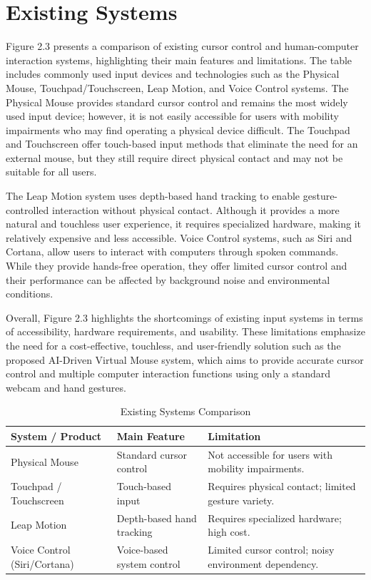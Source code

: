\documentclass[12pt,a4paper]{report}
\begin{document}
\newpage
\section{Existing Systems}
Figure 2.3 presents a comparison of existing cursor control and human-computer interaction systems, highlighting their main features and limitations. The table includes commonly used input devices and technologies such as the Physical Mouse, Touchpad/Touchscreen, Leap Motion, and Voice Control systems. The Physical Mouse provides standard cursor control and remains the most widely used input device; however, it is not easily accessible for users with mobility impairments who may find operating a physical device difficult. The Touchpad and Touchscreen offer touch-based input methods that eliminate the need for an external mouse, but they still require direct physical contact and may not be suitable for all users.

The Leap Motion system uses depth-based hand tracking to enable gesture-controlled interaction without physical contact. Although it provides a more natural and touchless user experience, it requires specialized hardware, making it relatively expensive and less accessible. Voice Control systems, such as Siri and Cortana, allow users to interact with computers through spoken commands. While they provide hands-free operation, they offer limited cursor control and their performance can be affected by background noise and environmental conditions.

Overall, Figure 2.3 highlights the shortcomings of existing input systems in terms of accessibility, hardware requirements, and usability. These limitations emphasize the need for a cost-effective, touchless, and user-friendly solution such as the proposed AI-Driven Virtual Mouse system, which aims to provide accurate cursor control and multiple computer interaction functions using only a standard webcam and hand gestures.

\begin{table}[ht]
\centering
\caption{Existing Systems Comparison}
\label{tab:existing}
\begin{tabular}{|p{3cm}|p{3.5cm}|p{5cm}|}
\hline
\textbf{System / Product} & \textbf{Main Feature} & \textbf{Limitation} \\
\hline
Physical Mouse 
& Standard cursor control 
& Not accessible for users with mobility impairments. \\
\hline
Touchpad / Touchscreen 
& Touch-based input 
& Requires physical contact; limited gesture variety. \\
\hline
Leap Motion 
& Depth-based hand tracking 
& Requires specialized hardware; high cost. \\
\hline
Voice Control (Siri/Cortana) 
& Voice-based system control 
& Limited cursor control; noisy environment dependency. \\
\hline
\end{tabular}
\end{table}
\newpage
\end{document}
